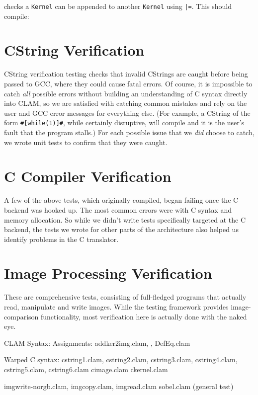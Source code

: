  checks a \texttt{Kernel} can be appended to another \texttt{Kernel} using \texttt{|=}. This should compile:


\section{CString Verification}
\label{testing:cstrings}

CString verification testing checks that invalid CStrings are caught before being passed to GCC, where they
could cause fatal errors. Of course, it is impossible to catch \emph{all} possible errors without
building an understanding of C syntax directly into CLAM, so we are satisfied with catching common
mistakes and rely on the user and GCC error messages for everything else. (For example, a CString of the form \texttt{\#[while(1)]\#},
while certainly disruptive, will compile and it is the user's fault that the program stalls.)
For each possible issue that we \emph{did} choose to catch, we wrote unit tests to confirm that they were caught.\\

\section{C Compiler Verification}
\label{test:ccompiler}

A few of the above tests, which originally compiled, began failing once the C backend was hooked up.
The most common errors were with C syntax and memory allocation.
So while we didn't write tests specifically targeted at the C backend,
the tests we wrote for other parts of the architecture also helped us identify problems in the C translator. 

\section{Image Processing Verification}
\label{test:output}

These are comprehensive tests, consisting of full-fledged programs that actually
read, manipulate and write images. While the testing framework provides image-comparison functionality,
most verification here is actually done with the naked eye.


CLAM Syntax:
	Assignments: 
		addker2img.clam, , DefEq.clam



Warped C syntax:
	cstring1.clam, cstring2.clam, cstring3.clam, cstring4.clam, cstring5.clam, cstring6.clam
	cimage.clam
	ckernel.clam

	imgwrite-norgb.clam,  imgcopy.clam,  imgread.clam
	sobel.clam (general test)

